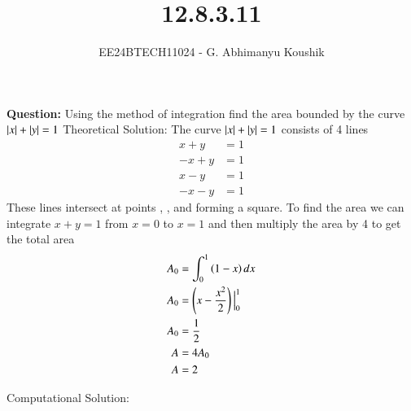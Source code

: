 \documentclass[journal]{IEEEtran}
\begin{document}

\vspace{3cm}

\title{12.8.3.11}
\author{EE24BTECH11024 - G. Abhimanyu Koushik}
{\let\newpage\relax\maketitle}
\textbf{Question:}
Using the method of integration find the area bounded by the curve $\left\vert x\right\vert + \left\vert y\right\vert = 1$
\solution\newline
Theoretical Solution:\newline
The curve $\left\vert x\right\vert + \left\vert y\right\vert = 1$ consists of 4 lines
\begin{align}
	x+y&=1\\
	-x+y&=1\\
	x-y&=1\\
	-x-y&=1
\end{align}
These lines intersect at points , ,  and  forming a square. To find the area we can integrate $x+y=1$ from $x=0$ to $x=1$ and then multiply the area by 4 to get the total area   
\begin{align}
	A_0 &= \int_{0}^{1}\left(1-x\right)dx\\
	A_0 &= \left(x-\frac{x^2}{2}\right)\Big|_0^1\\
	A_0 &= \frac{1}{2}\\
	A &= 4A_0\\
	A &= 2
\end{align}

Computational Solution:\newline
\end{document}
